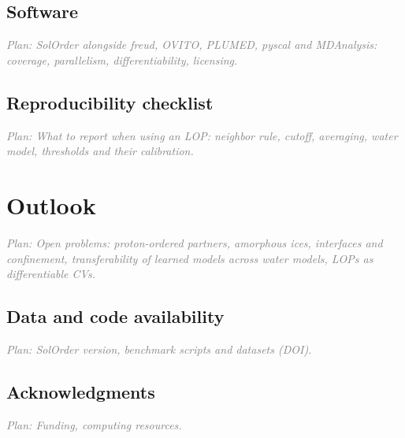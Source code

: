 \documentclass{template1}
\newcommand{\plan}[1]{\par\noindent\textcolor{gray}{\textit{Plan: #1}}\par}
\begin{document}
\section{Software}
\plan{SolOrder alongside freud, OVITO, PLUMED, pyscal and MDAnalysis:
coverage, parallelism, differentiability, licensing.}

\section{Reproducibility checklist}
\plan{What to report when using an LOP: neighbor rule, cutoff, averaging,
water model, thresholds and their calibration.}

\chapter{Outlook}\label{ch:outlook}
\plan{Open problems: proton-ordered partners, amorphous ices, interfaces and
confinement, transferability of learned models across water models, LOPs as
differentiable CVs.}

\section*{Data and code availability}
\plan{SolOrder version, benchmark scripts and datasets (DOI).}

\section*{Acknowledgments}
\plan{Funding, computing resources.}

% 
% 
% 
% 
\end{document}
